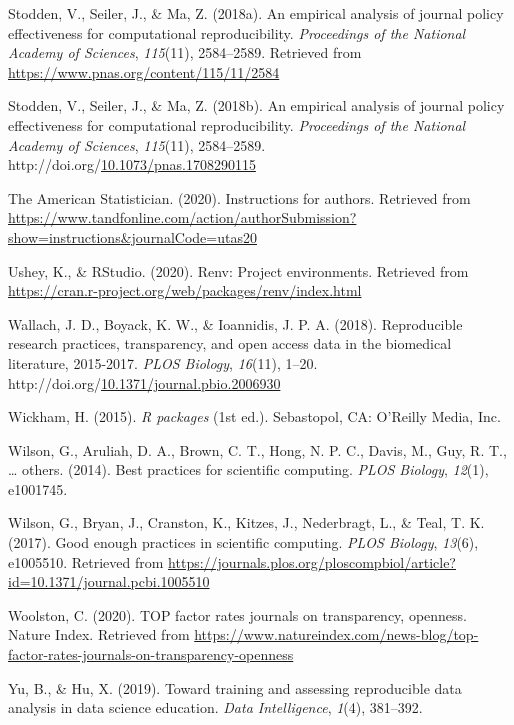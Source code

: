 \documentclass[12pt,twoside]{reedthesis}
\newenvironment{CSLReferences}%
  {}%
  {\par}
\begin{document}
\begin{CSLReferences}{1}{0}
\leavevmode\hypertarget{ref-policy-effectiveness}{}%
Stodden, V., Seiler, J., \& Ma, Z. (2018a). An empirical analysis of journal policy effectiveness for computational reproducibility. \emph{Proceedings of the National Academy of Sciences}, \emph{115}(11), 2584--2589. Retrieved from \url{https://www.pnas.org/content/115/11/2584}

\leavevmode\hypertarget{ref-Stodden2584}{}%
Stodden, V., Seiler, J., \& Ma, Z. (2018b). An empirical analysis of journal policy effectiveness for computational reproducibility. \emph{Proceedings of the National Academy of Sciences}, \emph{115}(11), 2584--2589. http://doi.org/\href{https://doi.org/10.1073/pnas.1708290115}{10.1073/pnas.1708290115}

\leavevmode\hypertarget{ref-ams-guide}{}%
The American Statistician. (2020). Instructions for authors. Retrieved from \url{https://www.tandfonline.com/action/authorSubmission?show=instructions\&journalCode=utas20}

\leavevmode\hypertarget{ref-R-renv}{}%
Ushey, K., \& RStudio. (2020). Renv: Project environments. Retrieved from \url{https://cran.r-project.org/web/packages/renv/index.html}

\leavevmode\hypertarget{ref-plos-biology}{}%
Wallach, J. D., Boyack, K. W., \& Ioannidis, J. P. A. (2018). Reproducible research practices, transparency, and open access data in the biomedical literature, 2015-2017. \emph{PLOS Biology}, \emph{16}(11), 1--20. http://doi.org/\href{https://doi.org/10.1371/journal.pbio.2006930}{10.1371/journal.pbio.2006930}

\leavevmode\hypertarget{ref-hadley-packages}{}%
Wickham, H. (2015). \emph{R packages} (1st ed.). Sebastopol, CA: O'Reilly Media, Inc.

\leavevmode\hypertarget{ref-wilson2014best}{}%
Wilson, G., Aruliah, D. A., Brown, C. T., Hong, N. P. C., Davis, M., Guy, R. T., \ldots{} others. (2014). Best practices for scientific computing. \emph{PLOS Biology}, \emph{12}(1), e1001745.

\leavevmode\hypertarget{ref-wilson2017good}{}%
Wilson, G., Bryan, J., Cranston, K., Kitzes, J., Nederbragt, L., \& Teal, T. K. (2017). Good enough practices in scientific computing. \emph{PLOS Biology}, \emph{13}(6), e1005510. Retrieved from \url{https://journals.plos.org/ploscompbiol/article?id=10.1371/journal.pcbi.1005510}

\leavevmode\hypertarget{ref-top-guidelines}{}%
Woolston, C. (2020). TOP factor rates journals on transparency, openness. Nature Index. Retrieved from \url{https://www.natureindex.com/news-blog/top-factor-rates-journals-on-transparency-openness}

\leavevmode\hypertarget{ref-yu2019toward}{}%
Yu, B., \& Hu, X. (2019). Toward training and assessing reproducible data analysis in data science education. \emph{Data Intelligence}, \emph{1}(4), 381--392.

\end{CSLReferences}

\end{document}
